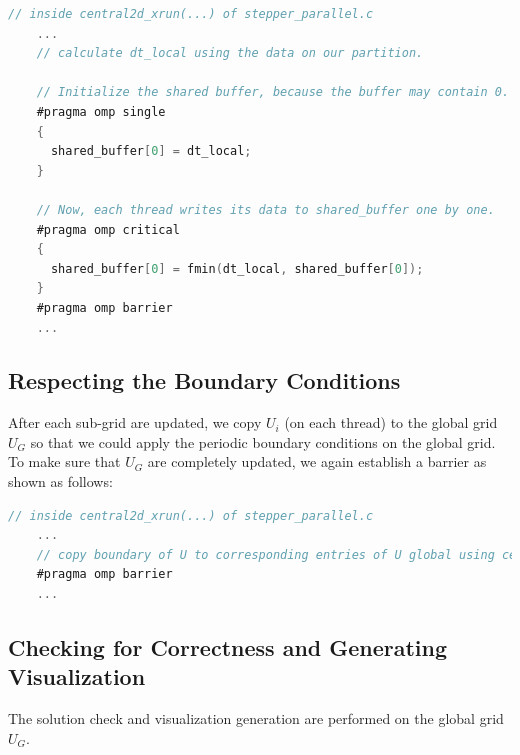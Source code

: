 \documentclass{article}
\begin{document}
\begin{lstlisting}[language=C]
// inside central2d_xrun(...) of stepper_parallel.c
    ...
    // calculate dt_local using the data on our partition.

    // Initialize the shared buffer, because the buffer may contain 0.
    #pragma omp single
    {
      shared_buffer[0] = dt_local;
    }

    // Now, each thread writes its data to shared_buffer one by one.
    #pragma omp critical
    {
      shared_buffer[0] = fmin(dt_local, shared_buffer[0]);
    }
    #pragma omp barrier
    ...
\end{lstlisting}

\subsection{Respecting the Boundary Conditions}
After each sub-grid are updated, we copy $U_i$ (on each thread) to the global grid $U_G$ so that
we could apply the periodic boundary conditions on the global grid. To make sure that $U_G$ are completely updated, we again establish
a barrier as shown as follows:

\begin{lstlisting}[language=C]
// inside central2d_xrun(...) of stepper_parallel.c
    ...
    // copy boundary of U to corresponding entries of U global using central2d_local_to_global(...)
    #pragma omp barrier
    ...
\end{lstlisting}

\subsection{Checking for Correctness and Generating Visualization}
The solution check and visualization generation are performed on the global grid $U_G$.

\end{document}
